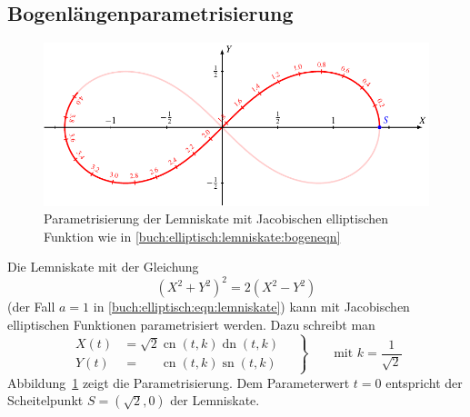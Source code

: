 \subsection{Bogenlängenparametrisierung}
\begin{figure}
\centering
\includegraphics{chapters/110-elliptisch/images/lemnispara.pdf}
\caption{Parametrisierung der Lemniskate mit Jacobischen elliptischen
Funktion wie in \eqref{buch:elliptisch:lemniskate:bogeneqn}
\label{buch:elliptisch:lemniskate:bogenpara}}
\end{figure}
Die Lemniskate mit der Gleichung
\[
(X^2+Y^2)^2=2(X^2-Y^2)
\]
(der Fall $a=1$ in \eqref{buch:elliptisch:eqn:lemniskate})
kann mit Jacobischen elliptischen Funktionen
parametrisiert werden.
Dazu schreibt man
\begin{equation}
\left.
\begin{aligned}
X(t)
&=
\sqrt{2}\operatorname{cn}(t,k) \operatorname{dn}(t,k)
\\
Y(t)
&=
\phantom{\sqrt{2}}
\operatorname{cn}(t,k) \operatorname{sn}(t,k)
\end{aligned}
\quad\right\}
\qquad\text{mit $k=\displaystyle\frac{1}{\sqrt{2}}$}
\label{buch:elliptisch:lemniskate:bogeneqn}
\end{equation}
Abbildung~\ref{buch:elliptisch:lemniskate:bogenpara} zeigt die
Parametrisierung. 
Dem Parameterwert $t=0$ entspricht der Scheitelpunkt
$S=(\sqrt{2},0)$ der Lemniskate.

%
%
